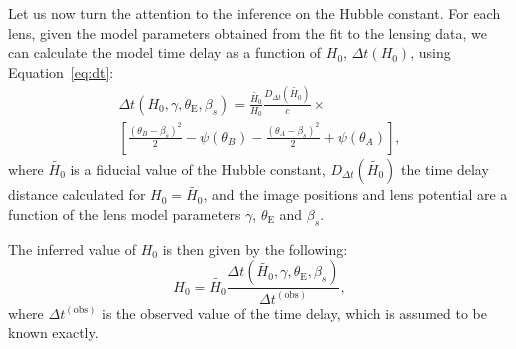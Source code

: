 \documentclass[usenatbib]{mnras}
\def\tein{\theta_{\mathrm{E}}}
\def\Eref#1{Equation~\ref{#1}\xspace}
\begin{document}
Let us now turn the attention to the inference on the Hubble constant.
For each lens, given the model parameters obtained from the fit to the lensing data, we can calculate the model time delay as a function of $H_0$, $\Delta t(H_0)$, using \Eref{eq:dt}:
\begin{multline}
\Delta t (H_0, \gamma, \tein, \beta_s) = \frac{\tilde{H_0}}{H_0}\frac{D_{\Delta t}(\tilde{H_0})}{c} \times \\
\left[\frac{(\theta_B - \beta_s)^2}{2} - \psi(\theta_B) - \frac{(\theta_A - \beta_s)^2}{2} + \psi(\theta_A)\right],
\end{multline}
where $\tilde{H_0}$ is a fiducial value of the Hubble constant, $D_{\Delta t}(\tilde{H_0})$ the time delay distance calculated for $H_0=\tilde{H_0}$, and the image positions and lens potential are a function of the lens model parameters $\gamma$, $\tein$ and $\beta_s$.

The inferred value of $H_0$ is then given by the following:
\begin{equation}
H_0 = \tilde{H_0} \frac{\Delta t (\tilde{H_0}, \gamma, \tein, \beta_s)}{\Delta t^{\mathrm{(obs)}}},
\end{equation}
where $\Delta t^{\mathrm{(obs)}}$ is the observed value of the time delay, which is assumed to be known exactly.
\end{document}
